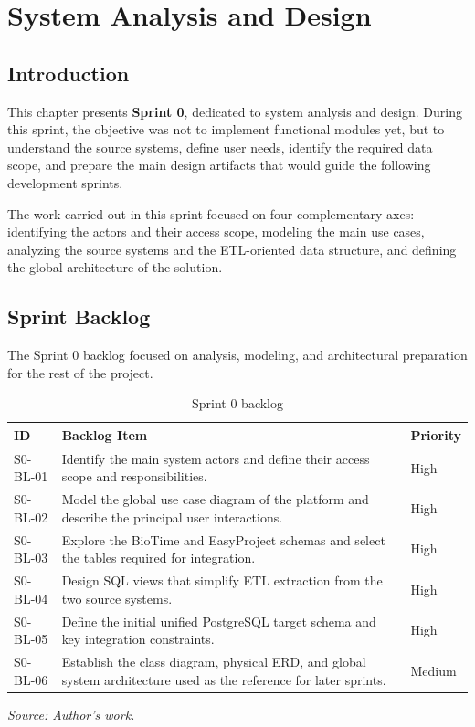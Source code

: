 \chapter{System Analysis and Design}
\minitoc
\clearpage

\section{Introduction}
This chapter presents \textbf{Sprint 0}, dedicated to system analysis and design. During this sprint, the objective was not to implement functional modules yet, but to understand the source systems, define user needs, identify the required data scope, and prepare the main design artifacts that would guide the following development sprints.

The work carried out in this sprint focused on four complementary axes: identifying the actors and their access scope, modeling the main use cases, analyzing the source systems and the ETL-oriented data structure, and defining the global architecture of the solution.

\section{Sprint Backlog}
The Sprint 0 backlog focused on analysis, modeling, and architectural preparation for the rest of the project.

\begin{table}[H]
	\centering
	\renewcommand{\arraystretch}{1.2}
	\begin{tabular}{|l|>{\raggedright\arraybackslash}p{10.2cm}|l|}
		\hline
		\textbf{ID} & \textbf{Backlog Item} & \textbf{Priority} \\
		\hline
		S0-BL-01 & Identify the main system actors and define their access scope and responsibilities. & High \\
		\hline
		S0-BL-02 & Model the global use case diagram of the platform and describe the principal user interactions. & High \\
		\hline
		S0-BL-03 & Explore the BioTime and EasyProject schemas and select the tables required for integration. & High \\
		\hline
		S0-BL-04 & Design SQL views that simplify ETL extraction from the two source systems. & High \\
		\hline
		S0-BL-05 & Define the initial unified PostgreSQL target schema and key integration constraints. & High \\
		\hline
		S0-BL-06 & Establish the class diagram, physical ERD, and global system architecture used as the reference for later sprints. & Medium \\
		\hline
	\end{tabular}
	\caption{Sprint 0 backlog}
	\label{tab:sprint-0-backlog}
	{\footnotesize\textit{Source: Author's work.}}
\end{table}

